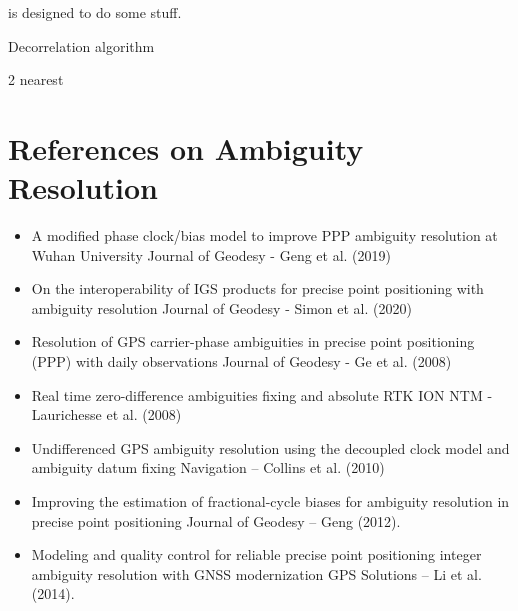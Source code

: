  is designed to do some stuff.



Decorrelation algorithm

2 nearest

\section{References on Ambiguity Resolution}

\begin{itemize}
    \item A modified phase clock/bias model to improve PPP ambiguity resolution at Wuhan University Journal of Geodesy - Geng et al. (2019)
    \item On the interoperability of IGS products for precise point positioning with ambiguity resolution Journal of Geodesy - Simon et al. (2020)
    \item Resolution of GPS carrier-phase ambiguities in precise point positioning (PPP) with daily observations Journal of Geodesy - Ge et al. (2008)
    \item Real time zero-difference ambiguities fixing and absolute RTK ION NTM - Laurichesse et al. (2008)
    \item Undifferenced GPS ambiguity resolution using the decoupled clock model and ambiguity datum fixing Navigation – Collins et al. (2010)
    \item Improving the estimation of fractional-cycle biases for ambiguity resolution in precise point positioning Journal of Geodesy – Geng (2012).
    \item Modeling and quality control for reliable precise point positioning integer ambiguity resolution with GNSS modernization
GPS Solutions – Li et al. (2014).
\end{itemize}

